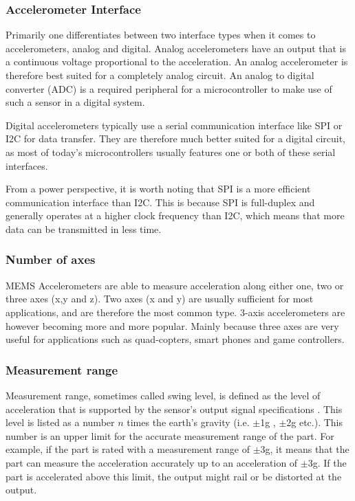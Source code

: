 \subsubsection{Accelerometer Interface}

Primarily one differentiates between two interface types when it comes to accelerometers, analog and digital. Analog accelerometers have an output that is a continuous voltage proportional to the acceleration. An analog accelerometer is therefore best suited for a completely analog circuit. An analog to digital converter (ADC) is a required peripheral for a microcontroller to make use of such a sensor in a digital system.

Digital accelerometers typically use a serial communication interface like SPI or I2C for data transfer. They are therefore much better suited for a digital circuit, as most of today's microcontrollers usually features one or both of these serial interfaces.

From a power perspective, it is worth noting that SPI is a more efficient communication interface than I2C. This is because SPI is full-duplex and generally operates at a higher clock frequency than I2C, which means that more data can be transmitted in less time. 

\subsubsection{Number of axes}
MEMS Accelerometers are able to measure acceleration along either one, two or three axes (x,y and z). Two axes (x and y) are usually sufficient for most applications, and are therefore the most common type. 3-axis accelerometers are however becoming more and more popular. Mainly because three axes are very useful for applications such as quad-copters, smart phones and game controllers.

\subsubsection{Measurement range}
Measurement range, sometimes called swing level, is defined as the level of acceleration that is supported by the sensor’s output signal specifications \cite{analog_accel_guide}. This level is listed as a number $n$ times the earth’s gravity (i.e. $\pm$1g , $\pm$2g etc.). This number is an upper limit for the accurate measurement range of the part. For example, if the part is rated with a measurement range of $\pm$3g, it means that the part can measure the acceleration accurately up to an acceleration of $\pm$3g.  If the part is accelerated above this limit, the output might rail or be distorted at the output.

